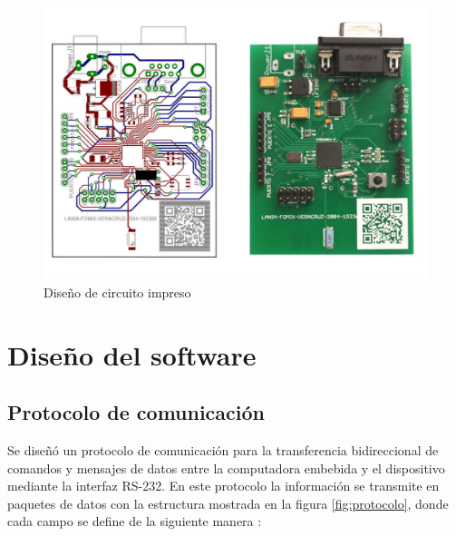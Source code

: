 \begin{figure}
	\centering
	\includegraphics[scale=0.4]{capitulo_3_imgs/diseno_pcb.pdf}
	\caption{Diseño de circuito impreso}
	\label{fig:circuito_fabricado}
\end{figure}

\section{Diseño del software}


\subsection{Protocolo de comunicación}

Se diseñó un protocolo de comunicación para la transferencia bidireccional de comandos y mensajes de datos entre la computadora embebida y el dispositivo mediante la interfaz RS-232. En este protocolo la información se transmite en paquetes de datos con la estructura mostrada en la figura \ref{fig:protocolo}, donde cada campo se define de la siguiente manera : 

